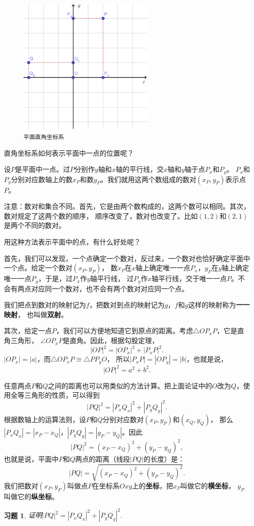 \documentclass[12pt,UTF8]{ctexbook}
\newtheorem{xt}{习题}[section]
\begin{document}
\begin{figure} %
    \vspace{-30pt}
    \centering
    \includegraphics[width=0.6\textwidth]{tu/坐标系2.png}
    \caption*{\texttt{平面直角坐标系}}
\end{figure}

直角坐标系如何表示平面中一点的位置呢？

设$P$是平面中一点。过$P$分别作$y$轴和$x$轴的平行线，交$x$轴和$y$轴于点$P_x$和$P_y$。
$P_x$和$P_y$分别对应数轴上的数$x_P$和数$y_P$。我们就用这两个数组成的数对$(x_P, y_P)$表示点$P$。

注意：数对和集合不同。首先，它是由两个数构成的，这两个数可以相同。其次，数对规定了这两个数的顺序，
顺序改变了，数对也改变了。比如$(1,2)$和$(2,1)$是两个不同的数对。

用这种方法表示平面中的点，有什么好处呢？

首先，我们可以发现，一个点确定一个数对，反过来，一个数对也恰好确定平面中一个点。给定一个数对$(x_P, y_P)$，
数$x_P$在$x$轴上确定唯一一点$P_x$，$y_P$在$y$轴上确定唯一一点$P_y$，于是，过$P_x$作$y$轴平行线，
过$P_y$作$x$轴平行线，交于唯一一点$P$。不会有两点对应同一个数对，也不会有两个数对对应同一个点。

我们把点到数对的映射记为$f$，把数对到点的映射记为$g$，$f$和$g$这样的映射称为\textbf{一一映射}，
也叫做\textbf{双射}。

其次，给定一点$P$，我们可以方便地知道它到原点的距离。考虑$\triangle OP_xP$，它是直角三角形，
$\angle OP_xP$是直角。因此，根据勾股定理，
$$|OP|^2 = |OP_x|^2 + |P_xP|^2.$$
$|OP_x| = |a|$，而$\triangle OP_xP\cong \triangle PP_yO$，
所以$|P_xP| = |OP_y| = |b|$，也就是说，
$$ |OP|^2 = a^2 + b^2.$$

任意两点$P$和$Q$之间的距离也可以用类似的方法计算。把上面论证中的$O$改为$Q$，使用全等三角形的性质，可以得到
$$|PQ|^2 = |P_xQ_x|^2 + |P_yQ_y|^2.$$
根据数轴上的运算法则，设$P$和$Q$分别对应数对$(x_P, y_P)$和$(x_Q, y_Q)$，
那么$|P_xQ_x| = |x_P- x_Q|$，$|P_yQ_y| = |y_P- y_Q|$。因此
$$ |PQ|^2 = (x_P- x_Q)^2 + (y_P - y_Q)^2,$$
也就是说，平面中$P$和$Q$两点的距离（线段$|PQ|$的长度）是：
$$ |PQ| = \sqrt{(x_P- x_Q)^2 + (y_P - y_Q)^2}.$$
我们把数对$(x_P, y_P)$叫做点$P$在坐标系$Oxy$上的\textbf{坐标}，把$x_P$叫做它的\textbf{横坐标}，
$y_P$叫做它的\textbf{纵坐标}。
\begin{xt}\label{ex:4-0-0}
    证明$|PQ|^2 = |P_xQ_x|^2 + |P_yQ_y|^2.$
\end{xt}
\end{document}

